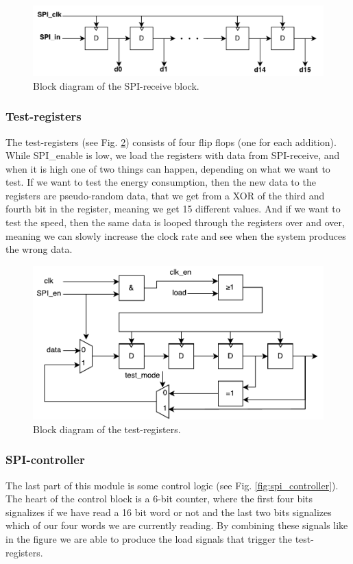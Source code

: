 \begin{figure}[H]
	\centering
	\captionsetup{justification=centering}
	\includegraphics[scale=0.5]{../figures/SPI_receive.pdf}
	\caption{Block diagram of the SPI-receive block.} \label{fig:spi_receive}
\end{figure}

\subsubsection{Test-registers}
The test-registers (see Fig. \ref{fig:spi_prbs}) consists of four flip flops (one for each addition). While SPI\_enable is low, we load the registers with data from SPI-receive, and when it is high one of two things can happen, depending on what we want to test. If we want to test the energy consumption, then the new data to the registers are pseudo-random data, that we get from a XOR of the third and fourth bit in the register, meaning we get 15 different values. And if we want to test the speed, then the same data is looped through the registers over and over, meaning we can slowly increase the clock rate and see when the system produces the wrong data.

\begin{figure}[H]
	\centering
	\captionsetup{justification=centering}
	\includegraphics[scale=0.5]{../figures/SPI_PRBS_2.pdf}
	\caption{Block diagram of the test-registers.} \label{fig:spi_prbs}
\end{figure}

\subsubsection{SPI-controller}
The last part of this module is some control logic (see Fig. \ref{fig:spi_controller}). The heart of the control block is a 6-bit counter, where the first four bits signalizes if we have read a 16 bit word or not and the last two bits signalizes which of our four words we are currently reading. By combining these signals like in the figure we are able to produce the load signals that trigger the test-registers.

